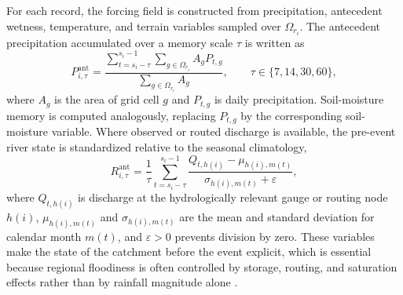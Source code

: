 \documentclass[pdflatex,sn-mathphys-ay]{sn-jnl}
\theoremstyle{thmstyleone}
\theoremstyle{thmstylethree}
\theoremstyle{thmstyletwo}
\begin{document}
For each record, the forcing field is constructed from precipitation,
antecedent wetness, temperature, and terrain variables sampled over
$\Omega_{r_i}$.  The antecedent precipitation accumulated over a memory
scale $\tau$ is written as
\begin{equation}
  P^{\mathrm{ant}}_{i,\tau}
  =
  \frac{
  \displaystyle
  \sum_{t=s_i-\tau}^{s_i-1}
  \sum_{g\in\Omega_{r_i}} A_g P_{t,g}
  }{
  \displaystyle
  \sum_{g\in\Omega_{r_i}} A_g
  },
  \qquad
  \tau\in\{7,14,30,60\},
  \label{eq:antecedent_precip}
\end{equation}
where $A_g$ is the area of grid cell $g$ and $P_{t,g}$ is daily
precipitation.  Soil-moisture memory is computed analogously, replacing
$P_{t,g}$ by the corresponding soil-moisture variable.  Where observed
or routed discharge is available, the pre-event river state is
standardized relative to the seasonal climatology,
\begin{equation}
  R^{\mathrm{ant}}_{i,\tau}
  =
  \frac{1}{\tau}
  \sum_{t=s_i-\tau}^{s_i-1}
  \frac{
    Q_{t,h(i)}-\mu_{h(i),m(t)}
  }{
    \sigma_{h(i),m(t)}+\varepsilon
  },
  \label{eq:river_state}
\end{equation}
where $Q_{t,h(i)}$ is discharge at the hydrologically relevant gauge or
routing node $h(i)$, $\mu_{h(i),m(t)}$ and $\sigma_{h(i),m(t)}$ are the
mean and standard deviation for calendar month $m(t)$, and
$\varepsilon>0$ prevents division by zero.  These variables make the
state of the catchment before the event explicit, which is essential
because regional floodiness is often controlled by storage, routing,
and saturation effects rather than by rainfall magnitude alone
\citep{Stephens2015}.
\end{document}
